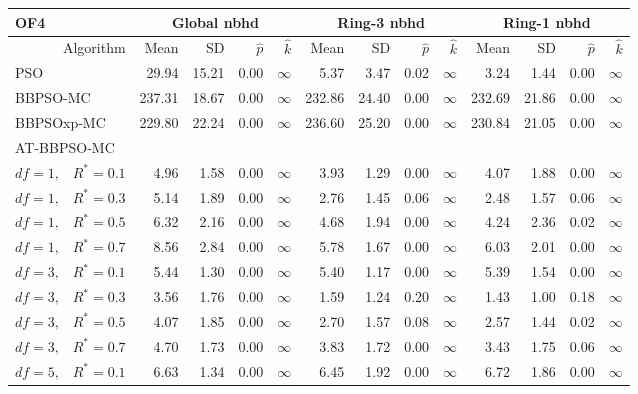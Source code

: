 \documentclass[cmbright]{staauth}
\begin{document}
\begin{table}[ht]
\centering
\tiny{
\begin{tabular}{r|rrrr|rrrr|rrrr}
\multicolumn{1}{l}{OF4} & \multicolumn{4}{c}{Global nbhd} & \multicolumn{4}{c}{Ring-3 nbhd} & \multicolumn{4}{c}{Ring-1 nbhd}\\
  \hline
Algorithm & Mean & SD & $\widehat{p}$ & $\widehat{k}$ & Mean & SD & $\widehat{p}$ & $\widehat{k}$ & Mean & SD & $\widehat{p}$ & $\widehat{k}$ \\
  \hline
\multicolumn{1}{l|}{PSO} & 29.94 & 15.21 & 0.00 & $\infty$ & 5.37 & 3.47 & 0.02 & $\infty$ & 3.24 & 1.44 & 0.00 & $\infty$ \\
  \multicolumn{1}{l|}{BBPSO-MC} & 237.31 & 18.67 & 0.00 & $\infty$ & 232.86 & 24.40 & 0.00 & $\infty$ & 232.69 & 21.86 & 0.00 & $\infty$ \\
  \multicolumn{1}{l|}{BBPSOxp-MC} & 229.80 & 22.24 & 0.00 & $\infty$ & 236.60 & 25.20 & 0.00 & $\infty$ & 230.84 & 21.05 & 0.00 & $\infty$ \\
\hline
\multicolumn{1}{l|}{AT-BBPSO-MC} &&&&&&&&&&&&\\
  $df = 1,\enspace$ $R^* =0.1$ & 4.96 & 1.58 & 0.00 & $\infty$ & 3.93 & 1.29 & 0.00 & $\infty$ & 4.07 & 1.88 & 0.00 & $\infty$ \\
  $df = 1,\enspace$ $R^* =0.3$ & 5.14 & 1.89 & 0.00 & $\infty$ & 2.76 & 1.45 & 0.06 & $\infty$ & 2.48 & 1.57 & 0.06 & $\infty$ \\
  $df = 1,\enspace$ $R^* =0.5$ & 6.32 & 2.16 & 0.00 & $\infty$ & 4.68 & 1.94 & 0.00 & $\infty$ & 4.24 & 2.36 & 0.02 & $\infty$ \\
  $df = 1,\enspace$ $R^* =0.7$ & 8.56 & 2.84 & 0.00 & $\infty$ & 5.78 & 1.67 & 0.00 & $\infty$ & 6.03 & 2.01 & 0.00 & $\infty$ \\
  $df = 3,\enspace$ $R^* =0.1$ & 5.44 & 1.30 & 0.00 & $\infty$ & 5.40 & 1.17 & 0.00 & $\infty$ & 5.39 & 1.54 & 0.00 & $\infty$ \\
  $df = 3,\enspace$ $R^* =0.3$ & 3.56 & 1.76 & 0.00 & $\infty$ & 1.59 & 1.24 & 0.20 & $\infty$ & 1.43 & 1.00 & 0.18 & $\infty$ \\
  $df = 3,\enspace$ $R^* =0.5$ & 4.07 & 1.85 & 0.00 & $\infty$ & 2.70 & 1.57 & 0.08 & $\infty$ & 2.57 & 1.44 & 0.02 & $\infty$ \\
  $df = 3,\enspace$ $R^* =0.7$ & 4.70 & 1.73 & 0.00 & $\infty$ & 3.83 & 1.72 & 0.00 & $\infty$ & 3.43 & 1.75 & 0.06 & $\infty$ \\
  $df = 5,\enspace$ $R^* =0.1$ & 6.63 & 1.34 & 0.00 & $\infty$ & 6.45 & 1.92 & 0.00 & $\infty$ & 6.72 & 1.86 & 0.00 & $\infty$ \\

\end{tabular}}
\end{table}
\end{document}
